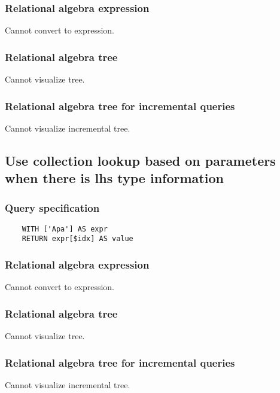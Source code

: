 	\subsubsection*{Relational algebra expression}

	Cannot convert to expression.

	\subsubsection*{Relational algebra tree}

	Cannot visualize tree.

	\subsubsection*{Relational algebra tree for incremental queries}

	Cannot visualize incremental tree.
	\subsection{Use collection lookup based on parameters when there is lhs type information}

	\subsubsection*{Query specification}

	\begin{lstlisting}
	WITH ['Apa'] AS expr
	RETURN expr[$idx] AS value
	\end{lstlisting}


	\subsubsection*{Relational algebra expression}

	Cannot convert to expression.

	\subsubsection*{Relational algebra tree}

	Cannot visualize tree.

	\subsubsection*{Relational algebra tree for incremental queries}

	Cannot visualize incremental tree.
